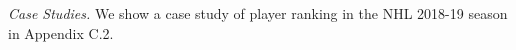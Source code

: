 \documentclass[letterpaper]{article} %
\newcommand{\confidence}{c}
\newcommand{\sys}{RiGIM}
\newcommand{\system}{\sys\;}
\begin{document}
{\it Case Studies.} We show a case study of player ranking in the NHL 2018-19 season in Appendix C.2.
\end{document}
